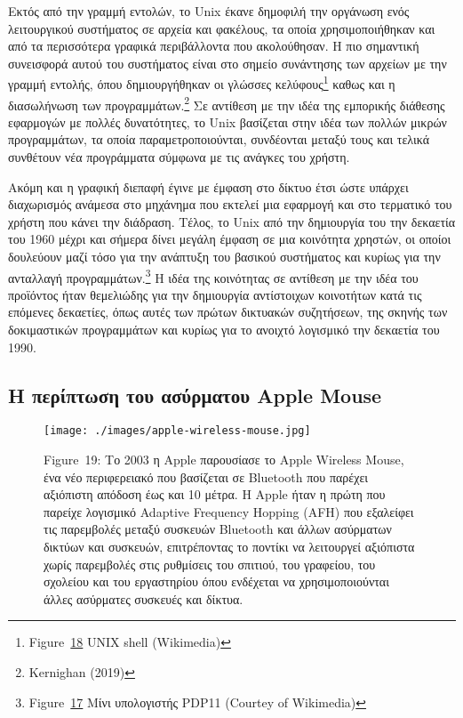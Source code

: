 \documentclass[
]{article}
\begin{document}
Εκτός από την γραμμή εντολών, το Unix έκανε δημοφιλή την οργάνωση ενός
λειτουργικού συστήματος σε αρχεία και φακέλους, τα οποία
χρησιμοποιήθηκαν και από τα περισσότερα γραφικά περιβάλλοντα που
ακολούθησαν. Η πιο σημαντική συνεισφορά αυτού του συστήματος είναι στο
σημείο συνάντησης των αρχείων με την γραμμή εντολής, όπου δημιουργήθηκαν
οι γλώσσες κελύφους\footnote{Figure~\protect\hyperlink{fig:unix-shell}{18}
  UNIX shell (Wikimedia)} καθως και η διασωλήνωση των
προγραμμάτων.\footnote{Kernighan (2019)} Σε αντίθεση με την ιδέα της
εμπορικής διάθεσης εφαρμογών με πολλές δυνατότητες, το Unix βασίζεται
στην ιδέα των πολλών μικρών προγραμμάτων, τα οποία παραμετροποιούνται,
συνδέονται μεταξύ τους και τελικά συνθέτουν νέα προγράμματα σύμφωνα με
τις ανάγκες του χρήστη.

Ακόμη και η γραφική διεπαφή έγινε με έμφαση στο δίκτυο έτσι ώστε υπάρχει
διαχωρισμός ανάμεσα στο μηχάνημα που εκτελεί μια εφαρμογή και στο
τερματικό του χρήστη που κάνει την διάδραση. Τέλος, το Unix από την
δημιουργία του την δεκαετία του 1960 μέχρι και σήμερα δίνει μεγάλη
έμφαση σε μια κοινότητα χρηστών, οι οποίοι δουλεύουν μαζί τόσο για την
ανάπτυξη του βασικού συστήματος και κυρίως για την ανταλλαγή
προγραμμάτων.\footnote{Figure~\protect\hyperlink{fig:pdp11-tty-unix}{17}
  Μίνι υπολογιστής PDP11 (Courtey of Wikimedia)} Η ιδέα της κοινότητας
σε αντίθεση με την ιδέα του προϊόντος ήταν θεμελιώδης για την δημιουργία
αντίστοιχων κοινοτήτων κατά τις επόμενες δεκαετίες, όπως αυτές των
πρώτων δικτυακών συζητήσεων, της σκηνής των δοκιμαστικών προγραμμάτων
και κυρίως για το ανοιχτό λογισμικό την δεκαετία του 1990.

\hypertarget{ux3b7-ux3c0ux3b5ux3c1ux3afux3c0ux3c4ux3c9ux3c3ux3b7-ux3c4ux3bfux3c5-ux3b1ux3c3ux3cdux3c1ux3bcux3b1ux3c4ux3bfux3c5-apple-mouse}{%
\subsection{Η περίπτωση του ασύρματου Apple
Mouse}\label{ux3b7-ux3c0ux3b5ux3c1ux3afux3c0ux3c4ux3c9ux3c3ux3b7-ux3c4ux3bfux3c5-ux3b1ux3c3ux3cdux3c1ux3bcux3b1ux3c4ux3bfux3c5-apple-mouse}}

\leavevmode{}%
\begin{figure}
\hypertarget{fig:apple-wireless-mouse}{%
\centering
\texttt{[image: ./images/apple-wireless-mouse.jpg]}
\caption{Figure~19: Το 2003 η Apple παρουσίασε το Apple Wireless Mouse,
ένα νέο περιφερειακό που βασίζεται σε Bluetooth που παρέχει αξιόπιστη
απόδοση έως και 10 μέτρα. Η Apple ήταν η πρώτη που παρείχε λογισμικό
Adaptive Frequency Hopping (AFH) που εξαλείφει τις παρεμβολές μεταξύ
συσκευών Bluetooth και άλλων ασύρματων δικτύων και συσκευών,
επιτρέποντας το ποντίκι να λειτουργεί αξιόπιστα χωρίς παρεμβολές στις
ρυθμίσεις του σπιτιού, του γραφείου, του σχολείου και του εργαστηρίου
όπου ενδέχεται να χρησιμοποιούνται άλλες ασύρματες συσκευές και
δίκτυα.}\label{fig:apple-wireless-mouse}
}
\end{figure}
\end{document}
